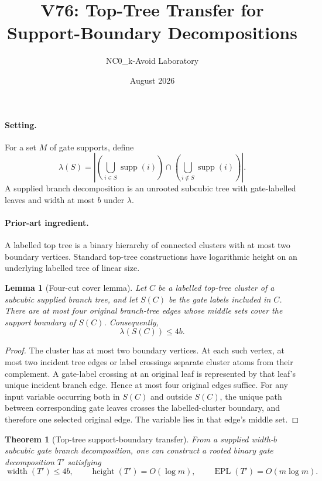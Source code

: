 \documentclass[11pt]{article}
\title{V76: Top-Tree Transfer for Support-Boundary Decompositions}
\author{NC0\_k-Avoid Laboratory}
\date{August 2026}
\newtheorem{theorem}{Theorem}
\newtheorem{lemma}{Lemma}
\begin{document}
\maketitle

\paragraph{Setting.}
For a set $M$ of gate supports, define
\[
 \lambda(S)=\left|\left(\bigcup_{i\in S}\operatorname{supp}(i)\right)
 \cap\left(\bigcup_{i\notin S}\operatorname{supp}(i)\right)\right|.
\]
A supplied branch decomposition is an unrooted subcubic tree with gate-labelled
leaves and width at most $b$ under $\lambda$.

\paragraph{Prior-art ingredient.}
A labelled top tree is a binary hierarchy of connected clusters with at most
two boundary vertices. Standard top-tree constructions have logarithmic
height on an underlying labelled tree of linear size.

\begin{lemma}[Four-cut cover lemma]
Let $C$ be a labelled top-tree cluster of a subcubic supplied branch tree, and
let $S(C)$ be the gate labels included in $C$. There are at most four original
branch-tree edges whose middle sets cover the support boundary of $S(C)$.
Consequently,
\[
 \lambda(S(C))\le 4b.
\]
\end{lemma}

\begin{proof}
The cluster has at most two boundary vertices. At each such vertex, at most
two incident tree edges or label crossings separate cluster atoms from their
complement. A gate-label crossing at an original leaf is represented by that
leaf's unique incident branch edge. Hence at most four original edges suffice.
For any input variable occurring both in $S(C)$ and outside $S(C)$, the unique
path between corresponding gate leaves crosses the labelled-cluster boundary,
and therefore one selected original edge. The variable lies in that edge's
middle set.
\end{proof}

\begin{theorem}[Top-tree support-boundary transfer]
From a supplied width-$b$ subcubic gate branch decomposition, one can construct
a rooted binary gate decomposition $T'$ satisfying
\[
 \operatorname{width}(T')\le 4b,
 \qquad
 \operatorname{height}(T')=O(\log m),
 \qquad
 \operatorname{EPL}(T')=O(m\log m).
\]
\end{theorem}
\end{document}
